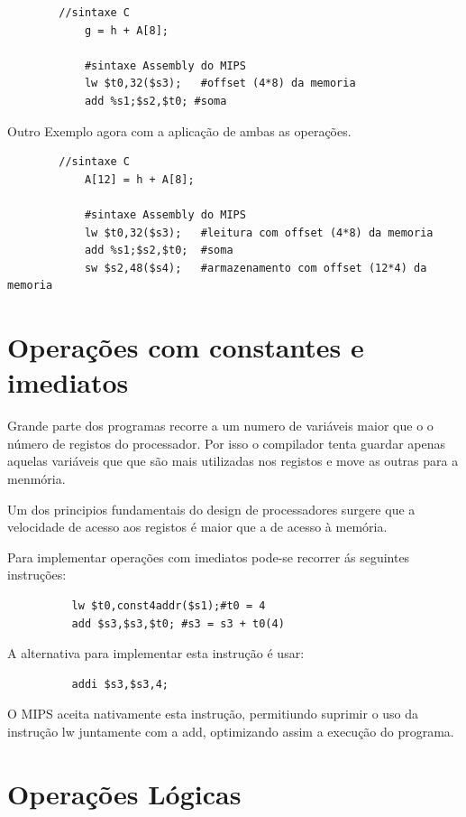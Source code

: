 \documentclass[10pt,a4paper]{book}
\begin{document}
	      \begin{lstlisting}
		//sintaxe C
	        g = h + A[8];

	        #sintaxe Assembly do MIPS
	        lw $t0,32($s3);   #offset (4*8) da memoria
	        add %s1;$s2,$t0; #soma
	      \end{lstlisting}

	      Outro Exemplo agora com a aplicação de ambas as operações.

	     \begin{lstlisting}
		//sintaxe C
	        A[12] = h + A[8];

	        #sintaxe Assembly do MIPS
	        lw $t0,32($s3);   #leitura com offset (4*8) da memoria
	        add %s1;$s2,$t0;  #soma
	        sw $s2,48($s4);	  #armazenamento com offset (12*4) da memoria
	      \end{lstlisting}

	  \section {Operações com constantes e imediatos}

	      Grande parte dos programas recorre a um numero de variáveis maior que o o número de registos do processador. Por isso o compilador tenta guardar apenas aquelas variáveis que
	      que são mais utilizadas nos registos e move as outras para a menmória.

	      Um dos principios fundamentais do design de processadores surgere que a velocidade de acesso aos registos é maior que a de acesso à memória.

	      Para implementar operações com imediatos pode-se recorrer ás seguintes instruções:

		\begin{lstlisting}
		  lw $t0,const4addr($s1);#t0 = 4
		  add $s3,$s3,$t0; #s3 = s3 + t0(4)
		\end{lstlisting}

	      A alternativa para implementar esta instrução é usar:

		\begin{lstlisting}
		  addi $s3,$s3,4;
		\end{lstlisting}

	      O MIPS aceita nativamente esta instrução, permitiundo suprimir o uso da instrução lw juntamente com a add, optimizando assim a execução do programa.

	  \section{Operações Lógicas}
\end{document}
